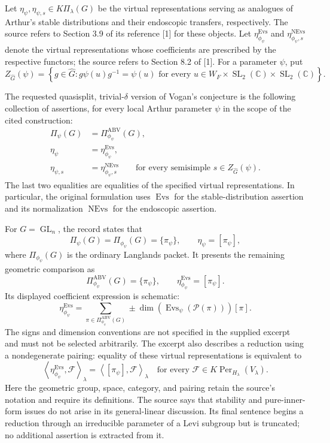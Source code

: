 \documentclass[11pt]{article}
\newcommand{\C}{\mathbb{C}}
\begin{document}
Let \(\eta_\psi,\eta_{\psi,s}\in K\Pi_\lambda(G)\) be the virtual representations serving as analogues of Arthur's stable distributions and their endoscopic transfers, respectively. The source refers to Section 3.9 of its reference [1] for these objects. Let \(\eta^{\operatorname{Evs}}_{\phi_\psi}\) and \(\eta^{\operatorname{NEvs}}_{\phi_\psi,s}\) denote the virtual representations whose coefficients are prescribed by the respective functors; the source refers to Section 8.2 of [1]. For a parameter \(\psi\), put
\[
Z_{\widehat G}(\psi)
=\left\{g\in\widehat G:
 g\psi(u)g^{-1}=\psi(u)\text{ for every }u
 \in W_F\times\operatorname{SL}_2(\C)\times\operatorname{SL}_2(\C)
\right\}.
\]

The requested quasisplit, trivial-\(\delta\) version of Vogan's conjecture is the following collection of assertions, for every local Arthur parameter \(\psi\) in the scope of the cited construction:
\begin{align*}
\Pi_\psi(G)&=\Pi^{\mathrm{ABV}}_{\phi_\psi}(G),\\
\eta_\psi&=\eta^{\operatorname{Evs}}_{\phi_\psi},\\
\eta_{\psi,s}&=\eta^{\operatorname{NEvs}}_{\phi_\psi,s}
\qquad\text{for every semisimple }s\in Z_{\widehat G}(\psi).
\end{align*}
The last two equalities are equalities of the specified virtual representations. In particular, the original formulation uses \(\operatorname{Evs}\) for the stable-distribution assertion and its normalization \(\operatorname{NEvs}\) for the endoscopic assertion.

For \(G=\operatorname{GL}_n\), the record states that
\[
\Pi_\psi(G)=\Pi_{\phi_\psi}(G)=\{\pi_\psi\},
\qquad \eta_\psi=[\pi_\psi],
\]
where \(\Pi_{\phi_\psi}(G)\) is the ordinary Langlands packet. It presents the remaining geometric comparison as
\[
\Pi^{\mathrm{ABV}}_{\phi_\psi}(G)=\{\pi_\psi\},
\qquad
\eta^{\operatorname{Evs}}_{\phi_\psi}=[\pi_\psi].
\]
Its displayed coefficient expression is schematic:
\[
\eta^{\operatorname{Evs}}_{\phi_\psi}
=
\sum_{\pi\in\Pi^{\mathrm{ABV}}_{\phi_\psi}(G)}
\pm\dim\!\left(\operatorname{Evs}_\psi(\mathcal P(\pi))\right)[\pi].
\]
The signs and dimension conventions are not specified in the supplied excerpt and must not be selected arbitrarily. The excerpt also describes a reduction using a nondegenerate pairing: equality of these virtual representations is equivalent to
\[
\left\langle\eta^{\operatorname{Evs}}_{\phi_\psi},\mathcal F\right\rangle_\lambda
=
\left\langle[\pi_\psi],\mathcal F\right\rangle_\lambda
\quad\text{for every }\mathcal F\in K\operatorname{Per}_{H_\lambda}(V_\lambda).
\]
Here the geometric group, space, category, and pairing retain the source's notation and require its definitions. The source says that stability and pure-inner-form issues do not arise in its general-linear discussion. Its final sentence begins a reduction through an irreducible parameter of a Levi subgroup but is truncated; no additional assertion is extracted from it.
\end{document}

